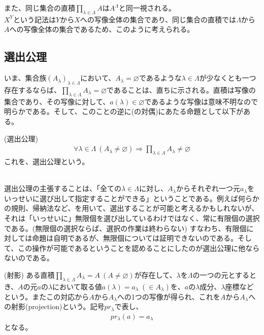 \documentclass[a4j]{jsarticle}
\begin{document}
 また、同じ集合の直積$\prod_{\lambda \in \Lambda}A$は$A^\Lambda$と同一視される。\\
$X^Y$という記法は$Y$から$X$への写像全体の集合であり、同じ集合の直積では$\Lambda$から$A$への写像全体の集合であるため、このように考えられる。

\subsection{選出公理}

いま、集合族$(A_\lambda)_{\lambda \in \Lambda}$において、$A_\lambda = \varnothing$であるような$\lambda \in \Lambda$が少なくとも一つ存在するならば、$\prod_{\lambda \in \Lambda}A_\lambda = \varnothing$であることは、直ちに示される。直積は写像の集合であり、その写像に対して、$a(\lambda) \in \varnothing$であるような写像は意味不明なので明らかである。そして、このことの逆に(の対偶)にあたる命題として以下がある。\\

\begin{itembox}[l]{ (選出公理)}
	\begin{align}
		\label{ac}
		\forall \lambda \in \Lambda\:(A_\lambda \neq \varnothing) \Rightarrow \prod_{\lambda \in \Lambda}A_\lambda \neq \varnothing \tag{AC}
	\end{align}
	これを、選出公理という。
\end{itembox}\\

 選出公理の主張することは、「全ての$\lambda \in \Lambda$に対し、$A_\lambda$からそれぞれ一つ元$a_\lambda$をいっせいに選び出して指定することができる」ということである。例えば何らかの規則、帰納法など、を用いて、選出することが可能と考えるかもしれないが、それは「いっせいに」無限個を選び出しているわけではなく、常に有限個の選択である。(無限個の選択ならば、選択の作業は終わらない) すなわち、有限個に対しては命題は自明であるが、無限個については証明できないのである。そして、この操作が可能であるということを認めることにしたのが選出公理に他ならないのである。

\begin{itembox}[l]{ (射影)}
	ある直積$\prod_{\lambda \in \Lambda}A_\lambda = A\:(A \neq \varnothing)$が存在して、$\lambda$を$\Lambda$の一つの元とするとき、$A$の元$a$の$\lambda$において取る値$a(\lambda)=a_\lambda\;(\in A_\lambda)$を、$a$の$\lambda$成分、$\lambda$座標などという。またこの対応から$A$から$A_\lambda$への1つの写像が得られ、これを$A$から$A_\lambda$への射影(projection)という。記号$pr_\lambda$で表し、
	\begin{align}
		pr_\lambda(a) = a_\lambda
	\end{align}
	となる。
\end{itembox}
\end{document}
